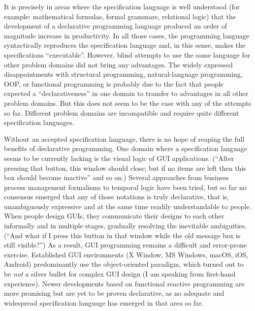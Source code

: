 It is precisely in areas where the specification language is well
understood (for example: mathematical formulas, formal grammars, relational
logic) that the development of a declarative programming language
produced an order of magnitude increase in productivity. In all those
cases, the programming language syntactically reproduces the specification
language and, in this sense, makes the specifications \textsf{``}executable\textsf{''}.
However, blind attempts to use the same language for other problem
domains did not bring any advantages. The widely expressed disappointments
with structural programming, natural-language programming, OOP, or
functional programming is probably due to the fact that people expected
a \textsf{``}declarativeness\textsf{''} in one domain to transfer to advantages in
all other problem domains. But this does not seem to be the case with
any of the attempts so far. Different problem domains are incompatible
and require quite different specification languages.

Without an accepted specification language, there is no hope of reaping
the full benefits of declarative programming. One domain where a specification
language seems to be currently lacking is the visual logic of GUI
applications. (\textsf{``}After pressing that button, this window should close;
but if no items are left then this box should become inactive\textsf{''} and
so on.) Several approaches \textemdash{} from business process management
formalisms to temporal logic \textemdash{} have been tried, but so
far no consensus emerged that any of those notations is truly declarative,
\textemdash{} that is, unambiguously expressive and at the same time
readily understandable to people. When people design GUIs, they communicate
their designs to each other informally and in multiple stages, gradually
resolving the inevitable ambiguities. (\textsf{``}And what if I press this
button in that window while the old message box is still visible?\textsf{''})
As a result, GUI programming remains a difficult and error-prone exercise.
Established GUI environments (X Window, MS Windows, macOS, iOS, Android)
predominantly use the object-oriented paradigm, which turned out to
be \emph{not} a silver bullet for complex GUI design (I am speaking
from first-hand experience). Newer developments based on functional
reactive programming are more promising but are yet to be proven declarative,
as no adequate and widespread specification language has emerged in
that area so far. 


